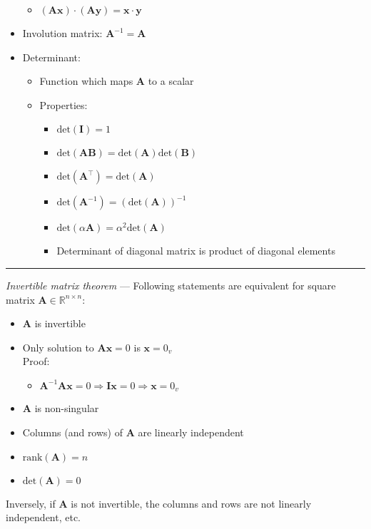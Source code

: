 \begin{itemize}
\begin{itemize}
        \item $(\boldsymbol{A}\boldsymbol{x}) \cdot (\boldsymbol{A}\boldsymbol{y}) = \boldsymbol{x} \cdot \boldsymbol{y}$
    \end{itemize}
    \item Involution matrix: $\boldsymbol{A}^{-1} = \boldsymbol{A}$
    \item Determinant: 
    \begin{itemize}
        \item Function which maps $\boldsymbol{A}$ to a scalar
        \item Properties:
        \begin{multicols}{2}
        \begin{itemize}
            \item $\textrm{det}(\boldsymbol{I}) = 1$
            \item $\textrm{det}(\boldsymbol{A}\boldsymbol{B}) = \textrm{det}(\boldsymbol{A})\textrm{det}(\boldsymbol{B})$
            \item $\textrm{det}(\boldsymbol{A}^\intercal) = \textrm{det}(\boldsymbol{A})$
            \item $\textrm{det}(\boldsymbol{A}^{-1}) = (\textrm{det}(\boldsymbol{A}))^{-1}$
            \item $\textrm{det}(\alpha\boldsymbol{A}) = \alpha^2\textrm{det}(\boldsymbol{A})$
            \item Determinant of diagonal matrix is product of diagonal elements
        \end{itemize}
        \end{multicols}
    \end{itemize}
    
\end{itemize}

{\color{lightgray}\hrule height 0.001mm}

\emph{Invertible matrix theorem} --- Following statements are equivalent for square matrix $\boldsymbol{A} \in \mathbb{R}^{n \times n}$: 
\begin{itemize}
    \item $\boldsymbol{A}$ is invertible
    \item Only solution to $\boldsymbol{A}\boldsymbol{x} = 0$ is $\boldsymbol{x} = 0_v$\\
    Proof:
    \begin{itemize}
        \item $\boldsymbol{A}^{-1} \boldsymbol{A} \boldsymbol{x} = 0 \Rightarrow \boldsymbol{I} \boldsymbol{x} = 0 \Rightarrow \boldsymbol{x} = 0_v$
    \end{itemize}
    \item $\boldsymbol{A}$ is non-singular
    \item Columns (and rows) of $\boldsymbol{A}$ are linearly independent
    \item $\textrm{rank}(\boldsymbol{A}) = n$
    \item $\textrm{det}(\boldsymbol{A}) = 0$
\end{itemize}
Inversely, if $\boldsymbol{A}$ is not invertible, the columns and rows are not linearly independent, etc. 

